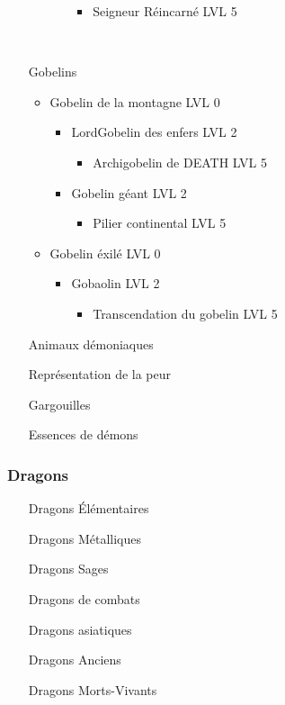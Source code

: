 \begin{itemize}
\begin{itemize}
\begin{itemize}
\begin{itemize}
							\item Seigneur Réincarné LVL 5
						\end{itemize}
				\end{itemize}
		\end{itemize}~\\
	\item[Gobelins] ~\\
		\begin{itemize}
			\item Gobelin de la montagne LVL 0
				\begin{itemize}
					\item LordGobelin des enfers LVL 2
						\begin{itemize}
							\item Archigobelin de DEATH  LVL 5
						\end{itemize}
					\item Gobelin géant LVL 2
						\begin{itemize}
							\item Pilier continental LVL 5
						\end{itemize}
				\end{itemize}
			\item Gobelin éxilé LVL 0
				\begin{itemize}
					\item  Gobaolin LVL 2
						\begin{itemize}
							\item Transcendation du gobelin LVL 5
						\end{itemize}
				\end{itemize}
		\end{itemize}
	\item[Animaux démoniaques]
	\item[Représentation de la peur]
	\item[Gargouilles]
	\item[Essences de démons]
\end{itemize}

\subsubsection{Dragons}

\begin{itemize}
	\item[Dragons Élémentaires]
	\item[Dragons Métalliques]
	\item[Dragons Sages]
	\item[Dragons de combats]
	\item[Dragons asiatiques]
	\item[Dragons Anciens]
	\item[Dragons Morts-Vivants]
\end{itemize}

